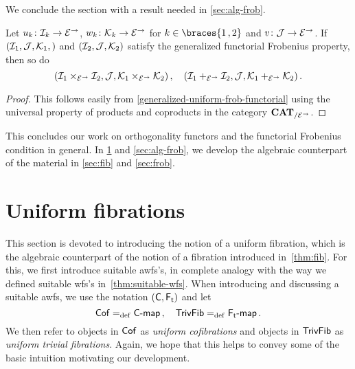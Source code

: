 \documentclass[reqno,10pt,a4paper,oneside,draft]{amsart}
\begin{document}
{{We conclude the section with a result needed in \cref{sec:alg-frob}.

\begin{proposition} \label{generalized-uniform-frob-product-u}
Let $u_k \co \cal{I}_k \to \cal{E}^\to$, $w_k \co \cal{K}_k \to \cal{E}^\to$ for $k \in \braces{1\,, 2}$ and $v \co \cal{J} \to \cal{E}^\to$.
If $(\cal{I}_1, \cal{J}, \cal{K}_1,)$ and $(\cal{I}_2, \cal{J}, \cal{K}_2)$ satisfy the generalized functorial Frobenius property, then so do
\[
(\cal{I}_1 \times_{\cal{E}^\to} \cal{I}_2, \cal{J}, \cal{K}_1 \times_{\cal{E}^\to} \cal{K}_2)
\, , \quad
(\cal{I}_1 +_{\cal{E}^\to} \cal{I}_2, \cal{J}, \cal{K}_1 +_{\cal{E}^\to} \cal{K}_2)
\, .\]
\end{proposition}

\begin{proof}
This follows easily from \cref{generalized-uniform-frob-functorial} using the universal property of products and coproducts in the category $\CAT_{/\cal{E}^\to}$.
\end{proof}

This concludes our work on orthogonality functors and the functorial Frobenius condition in general.
In \cref{sec:alg-fib} and \cref{sec:alg-frob}, we develop the algebraic counterpart of the material in \cref{sec:fib} and \cref{sec:frob}.

\section{Uniform fibrations}
\label{sec:alg-fib}

This section is devoted to introducing the notion of a uniform fibration, which is the algebraic counterpart of the notion of a fibration introduced in~\cref{thm:fib}.
For this, we first introduce suitable awfs's, in complete analogy with the way we defined suitable wfs's in~\cref{thm:suitable-wfs}.
When introducing and discussing a suitable awfs, we use the notation $(\CC, \TF)$ and let
\[
\Cof \defeq \pcoalg{\CC}
\, , \quad
\TrivFib \defeq \palg{\TF}
\, .\]
We then refer to objects in $\Cof$ as \emph{uniform cofibrations} and objects in $\TrivFib$ as \emph{uniform trivial fibrations}.
Again, we hope that this helps to convey some of the basic intuition motivating our development.

}}
\end{document}

